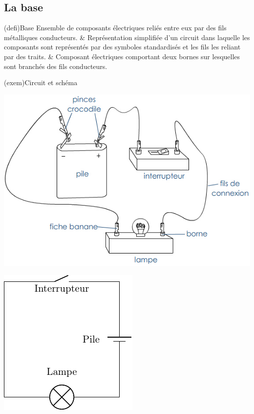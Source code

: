 \documentclass[../../main/main.tex]{subfiles}
\begin{document}
\subsection{La base}
\begin{tcb}[label=def:circuits, tabularx={Y|Y|Y}](defi){Base}
	Ensemble de composants électriques reliés entre eux par des fils
	métalliques conducteurs. &
	Représentation simplifiée d'un circuit dans laquelle les composants sont
	représentés par des symboles standardisés et les fils les reliant par des
	traits. &
	Composant électriques comportant deux bornes sur lesquelles sont branchés
	des fils conducteurs.
\end{tcb}
\begin{tcb}[label=exem:circuits, sidebyside](exem){Circuit et schéma}
	\begin{center}
		\includegraphics[width=.7\linewidth]{circuit_simple_dessin.jpg}
	\end{center}
	\tcblower
	\begin{center}
		\includegraphics[width=.5\linewidth]{circuit_simple.pdf}
	\end{center}
\end{tcb}
\end{document}
